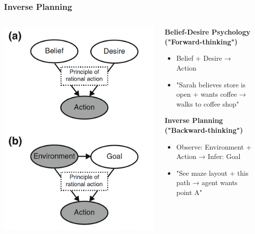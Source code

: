 \documentclass{beamer}
\begin{document}
\begin{frame}
\frametitle{Inverse Planning}
\begin{columns}
\begin{column}{0.5\textwidth}
\includegraphics[width=1.0\textwidth]{inverse_planning.png}
\end{column}
\begin{column}{0.5\textwidth}
\textbf{Belief-Desire Psychology ("Forward-thinking")}
\begin{itemize}
    \item Belief + Desire → Action
    \item "Sarah believes store is open + wants coffee → walks to coffee shop"
\end{itemize}

\vspace{0.4cm}
\textbf{Inverse Planning ("Backward-thinking")}
\begin{itemize}
    \item Observe: Environment + Action → Infer: Goal
    \item "See maze layout + this path → agent wants point A"
\end{itemize}
\end{column}
\end{columns}
\end{frame}
\end{document}
